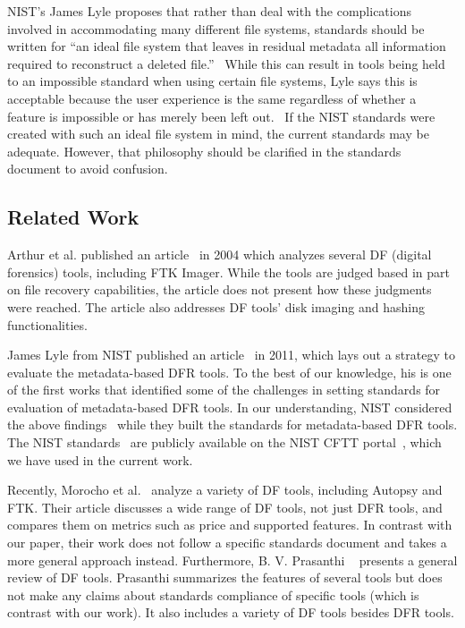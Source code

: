 NIST's James Lyle proposes that rather than deal with the complications involved in accommodating many different file systems, standards should be written for ``an ideal file system that leaves in residual metadata  all  information  required  to  reconstruct  a  deleted  file.''~\cite{lyle2011-ICDF2C} 
While this can result in tools being held to an impossible standard when using certain file systems, Lyle says this is acceptable because the user experience is the same regardless of whether a feature is impossible or has merely been left out.~\cite{lyle2011-ICDF2C}
If the NIST standards were created with such an ideal file system in mind, the current standards may be adequate.
However, that philosophy should be clarified in the standards document to avoid confusion.


\subsection{Related Work} \label{sec:discussion:subsec:related}

Arthur et al. published an article~\cite{arthur2004} in 2004 which analyzes several DF (digital forensics) tools, including FTK Imager.
While the tools are judged based in part on file recovery capabilities, the article does not present how these judgments were reached.
The article also addresses DF tools' disk imaging and hashing functionalities.

James Lyle from NIST published an article~\cite{lyle2011-ICDF2C} in 2011, which lays out a strategy to evaluate the metadata-based DFR tools. To the best of our knowledge, 
his is one of the first works that identified some of the challenges in setting standards for evaluation of metadata-based DFR tools.
In our understanding, NIST considered the above findings~\cite{lyle2011-ICDF2C} while they built the standards for metadata-based DFR tools.  
The NIST standards~\cite{meta:dfr:standards} are publicly available on the NIST CFTT portal~\cite{cftt:nist}, which we have used in the current work.

Recently, Morocho et al.~\cite{morocho2016} analyze a variety of DF tools, including Autopsy and FTK. 
Their article discusses a wide range of DF tools, not just DFR tools, and compares them on metrics such as price and supported features. 
In contrast with our paper, their work does not follow a specific standards document and takes a more general approach instead.
Furthermore, B. V. Prasanthi ~\cite{prasanthi2016} presents a general review of DF tools. 
Prasanthi summarizes the features of several tools but does not make any claims about standards compliance of specific tools (which is contrast with our work).
It also includes a variety of DF tools besides DFR tools.


